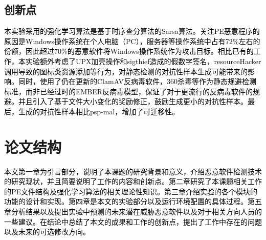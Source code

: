 \subsection{创新点}
\textcolor{black}{本实验采用的强化学习算法是基于时序查分算法的Sarsa算法。关注PE恶意程序的原因是Windows操作系统在个人电脑（PC），服务器等操作系统中占有72\%左右的份额，因此超过70\%的恶意软件将Windows操作系统作为攻击目标\cite{ref27}\cite{ref28}。相比已有的工作，本实验额外考虑了UPX加壳操作和sigthief造成的假数字签名，resourceHacker调用导致的图标类资源添加等行为，对静态检测的对抗性样本生成可能带来的影响。同时，使用了仍在更新的ClamAV反病毒软件，360杀毒等作为静态规避检测标准，而非已经过时的EMBER反病毒模型，保证了对于更流行的反病毒软件的规避。并且引入了基于文件大小变化的奖励修正，鼓励生成更小的对抗性样本。最后，生成的对抗性样本相比psp-mal，增加了可迁移性。}

\section{论文结构}
\textcolor{black}{本文第一章为引言部分，说明了本课题的研究背景和意义，介绍恶意软件检测技术的研究现状，并且简要说明了工作的内容和创新点。第二章研究了本课题相关工作的PE文件结构及强化学习算法的相关理论性知识。第三章介绍实验的各个模块的功能的设计和实现。第四章是本文的实验部分以及运行环境配置的具体过程。第五章分析结果以及提出实验中预测的未来潜在威胁恶意软件以及对于相关方向人员的一些建议。在结论中总结了本文的成果和工作的创新点，提出了工作中存在的问题以及未来的可选修改方向。}